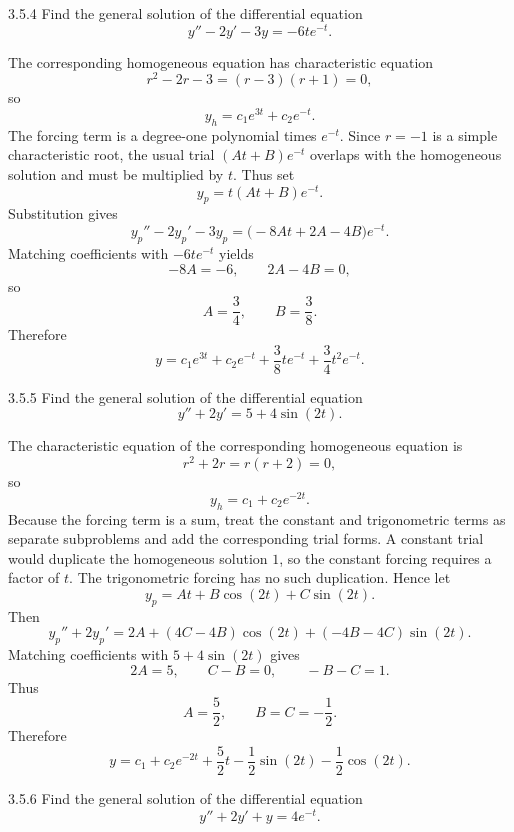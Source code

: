 \documentclass[11pt,oneside]{article}
\begin{document}

\begin{problem}{3.5.4}
Find the general solution of the differential equation
\[
    y''-2y'-3y=-6te^{-t}.
\]
\end{problem}

\begin{solution}
The corresponding homogeneous equation has characteristic equation
\[
    r^2-2r-3=(r-3)(r+1)=0,
\]
so
\[
    y_h=c_1e^{3t}+c_2e^{-t}.
\]
The forcing term is a degree-one polynomial times $e^{-t}$. Since $r=-1$ is a simple characteristic root, the usual trial $(At+B)e^{-t}$ overlaps with the homogeneous solution and must be multiplied by $t$. Thus set
\[
    y_p=t(At+B)e^{-t}.
\]
Substitution gives
\[
    y_p''-2y_p'-3y_p
    =\bigl(-8At+2A-4B\bigr)e^{-t}.
\]
Matching coefficients with $-6te^{-t}$ yields
\[
    -8A=-6,
    \qquad
    2A-4B=0,
\]
so
\[
    A=\frac34,
    \qquad
    B=\frac38.
\]
Therefore
\[
    \boxed{
        y=c_1e^{3t}+c_2e^{-t}
        +\frac38te^{-t}+\frac34t^2e^{-t}
    }.
\]
\end{solution}

\begin{problem}{3.5.5}
Find the general solution of the differential equation
\[
    y''+2y'=5+4\sin(2t).
\]
\end{problem}

\begin{solution}
The characteristic equation of the corresponding homogeneous equation is
\[
    r^2+2r=r(r+2)=0,
\]
so
\[
    y_h=c_1+c_2e^{-2t}.
\]
Because the forcing term is a sum, treat the constant and trigonometric terms as separate subproblems and add the corresponding trial forms. A constant trial would duplicate the homogeneous solution $1$, so the constant forcing requires a factor of $t$. The trigonometric forcing has no such duplication. Hence let
\[
    y_p=At+B\cos(2t)+C\sin(2t).
\]
Then
\[
    y_p''+2y_p'
    =2A+(4C-4B)\cos(2t)+(-4B-4C)\sin(2t).
\]
Matching coefficients with $5+4\sin(2t)$ gives
\[
    2A=5,
    \qquad
    C-B=0,
    \qquad
    -B-C=1.
\]
Thus
\[
    A=\frac52,
    \qquad
    B=C=-\frac12.
\]
Therefore
\[
    \boxed{
        y=c_1+c_2e^{-2t}
        +\frac52t-\frac12\sin(2t)-\frac12\cos(2t)
    }.
\]
\end{solution}

\begin{problem}{3.5.6}
Find the general solution of the differential equation
\[
    y''+2y'+y=4e^{-t}.
\]
\end{problem}
\end{document}
